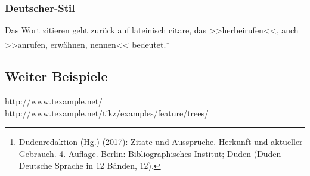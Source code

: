 \subsubsection{Deutscher-Stil}
\glqq Das Wort zitieren geht zurück auf lateinisch citare, das >>herbeirufen<<, auch >>anrufen, erwähnen, nennen<< bedeutet.\grqq\footnote{Dudenredaktion (Hg.) (2017): Zitate und Aussprüche. Herkunft und aktueller Gebrauch. 4. Auflage. Berlin: Bibliographisches Institut; Duden (Duden - Deutsche Sprache in 12 Bänden, 12).}

\subsection{Weiter Beispiele}
http://www.texample.net/\\
http://www.texample.net/tikz/examples/feature/trees/